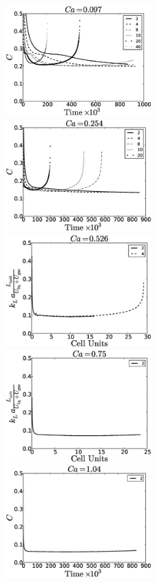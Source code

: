 \documentclass[preprint,12pt]{elsarticle}
\begin{document}
\begin{figure}[htb!]
\includegraphics[width=0.5\textwidth]{Figures/aver_conc_scale_ca097.eps}
\includegraphics[width=0.5\textwidth]{Figures/aver_conc_scale_ca054.eps}\\
\includegraphics[width=0.5\textwidth]{Figures/aver_conc_scale_ca026.eps}
\includegraphics[width=0.5\textwidth]{Figures/aver_conc_scale_ca05.eps}\\
\includegraphics[width=0.5\textwidth]{Figures/aver_conc_scale_ca14.eps}

\end{figure}
\end{document}
